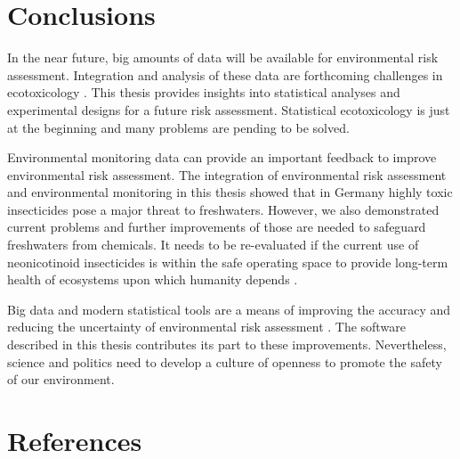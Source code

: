 \clearpage
\section{Conclusions}
In the near future, big amounts of data will be available for environmental risk assessment.
Integration and analysis of these data are forthcoming challenges in  ecotoxicology \citep{dafforn_big_2015, van_den_brink_new_2016}. 
This thesis provides insights into statistical analyses and experimental designs for a future risk assessment. Statistical ecotoxicology is just at the beginning and many problems are pending to be solved. 

Environmental monitoring data can provide an important feedback to improve environmental risk assessment. 
The integration of environmental risk assessment and environmental monitoring in this thesis showed that in Germany highly toxic insecticides pose a major threat to freshwaters.
However, we also demonstrated current problems and further improvements of those are needed to safeguard freshwaters from chemicals.
It needs to be re-evaluated if the current use of neonicotinoid insecticides is within the safe operating space to provide long-term health of ecosystems upon which humanity depends \citep{rockstrom_safe_2009}. 

Big data and modern statistical tools are a means of improving the accuracy and reducing the uncertainty of environmental risk assessment \citep{van_den_brink_new_2016}. 
The software described in this thesis contributes its part to these improvements.
Nevertheless, science and politics need to develop a culture of openness to promote the safety of our environment. 



\clearpage
\section{References}
\printbibliography[heading=none]

